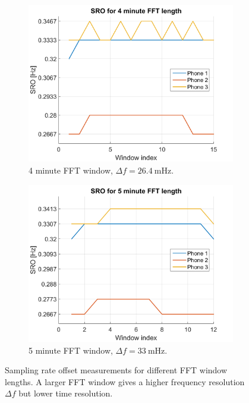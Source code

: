 \documentclass[a4paper, notitlepage]{report}
\begin{document}
\begin{figure}[H]
\begin{adjustwidth}{-1in}{-1in}
	\vspace{10pt}
	\begin{subfigure}{0.5\textwidth}
		\includegraphics[width=\textwidth]{figures/sro-measurement/sro-4min}
		\caption{4 minute FFT window, $\Delta f=26.4~\mathrm{mHz}$.}
		\label{app:sro_4min}
	\end{subfigure}
	\begin{subfigure}{0.5\textwidth}
		\includegraphics[width=\textwidth]{figures/sro-measurement/sro-5min}
		\caption{5 minute FFT window, $\Delta f=33~\mathrm{mHz}$.}
		\label{app:sro_5min}
	\end{subfigure}	
\end{adjustwidth}
\caption[Complete SRO measurement results.]{Sampling rate offset measurements for different FFT window lengths. A larger FFT window gives a higher frequency resolution $\Delta f$ but lower time resolution.}
\label{app:sro_total}
\end{figure}
\end{document}
